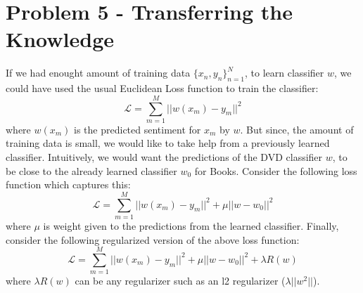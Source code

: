\documentclass{article}
\begin{document}
\section{Problem 5 - Transferring the Knowledge}
If we had enought amount of training data $\{x_n,y_n\}_{n=1}^N$, to learn classifier $w$, we could have used the usual Euclidean Loss function to train the classifier:
$$\mathcal{L} = \sum_{m=1}^M ||w(x_m)-y_m||^2$$
where $w(x_m)$ is the predicted sentiment for $x_m$ by $w$. But since, the amount of training data is small, we would like to take help from a previously learned classifier. Intuitively, we would want the predictions of the DVD classifier $w$, to be close to the already learned classifier $w_0$ for Books. Consider the following loss function which captures this:
$$\mathcal{L} = \sum_{m=1}^M ||w(x_m)-y_m||^2 + \mu||w-w_0||^2 $$ 
where $\mu$ is weight given to the predictions from the learned classifier. Finally, consider the following regularized version of the above loss function:
$$\mathcal{L} = \sum_{m=1}^M ||w(x_m)-y_m||^2 + \mu||w-w_0||^2 + \lambda R(w)$$ 
where $\lambda R(w)$ can be any regularizer such as an l2 regularizer ($\lambda||w^2||$).
\end{document}
